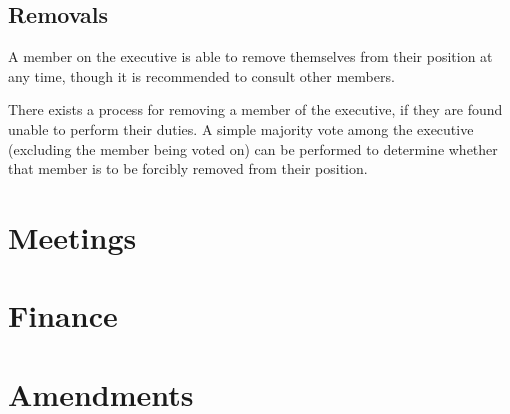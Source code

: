 \documentclass[11pt]{article}
\begin{document}
\subsection{Removals}

A member on the executive is able to remove themselves from their position at any time, though it is recommended to consult other members.

There exists a process for removing a member of the executive, if they are found unable to perform their duties. A simple majority vote among the executive (excluding the member being voted on) can be performed to determine whether that member is to be forcibly removed from their position.

\section{Meetings}

\section{Finance}

\section{Amendments}
\end{document}
